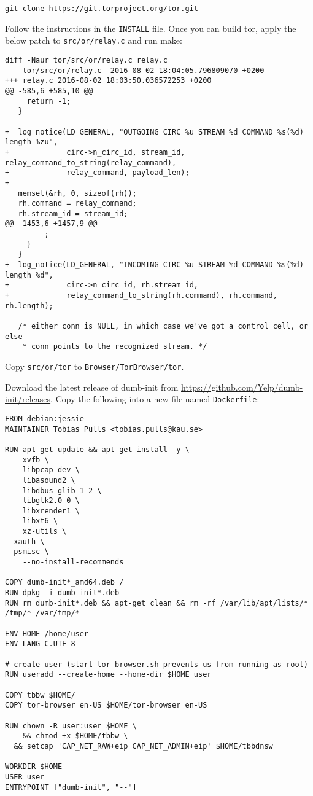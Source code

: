 \documentclass{article}
\begin{document}
\begin{lstlisting}
git clone https://git.torproject.org/tor.git
\end{lstlisting}
Follow the instructions in the {\tt INSTALL} file. Once you can build tor,
apply the below patch to {\tt src/or/relay.c} and run make:
\begin{lstlisting}
diff -Naur tor/src/or/relay.c relay.c
--- tor/src/or/relay.c	2016-08-02 18:04:05.796809070 +0200
+++ relay.c	2016-08-02 18:03:50.036572253 +0200
@@ -585,6 +585,10 @@
     return -1;
   }

+  log_notice(LD_GENERAL, "OUTGOING CIRC %u STREAM %d COMMAND %s(%d) length %zu",
+             circ->n_circ_id, stream_id, relay_command_to_string(relay_command),
+             relay_command, payload_len);
+
   memset(&rh, 0, sizeof(rh));
   rh.command = relay_command;
   rh.stream_id = stream_id;
@@ -1453,6 +1457,9 @@
         ;
     }
   }
+  log_notice(LD_GENERAL, "INCOMING CIRC %u STREAM %d COMMAND %s(%d) length %d",
+             circ->n_circ_id, rh.stream_id,
+             relay_command_to_string(rh.command), rh.command, rh.length);

   /* either conn is NULL, in which case we've got a control cell, or else
    * conn points to the recognized stream. */
\end{lstlisting}
Copy {\tt src/or/tor} to {\tt Browser/TorBrowser/tor}.

Download the latest release of dumb-init from
\url{https://github.com/Yelp/dumb-init/releases}.
Copy the following into a
new file named \texttt{Dockerfile}:

\begin{lstlisting}
FROM debian:jessie
MAINTAINER Tobias Pulls <tobias.pulls@kau.se>

RUN apt-get update && apt-get install -y \
	xvfb \
	libpcap-dev \
	libasound2 \
	libdbus-glib-1-2 \
	libgtk2.0-0 \
	libxrender1 \
	libxt6 \
	xz-utils \
  xauth \
  psmisc \
	--no-install-recommends

COPY dumb-init*_amd64.deb /
RUN dpkg -i dumb-init*.deb
RUN rm dumb-init*.deb && apt-get clean && rm -rf /var/lib/apt/lists/* /tmp/* /var/tmp/*

ENV HOME /home/user
ENV LANG C.UTF-8

# create user (start-tor-browser.sh prevents us from running as root)
RUN useradd --create-home --home-dir $HOME user

COPY tbbw $HOME/
COPY tor-browser_en-US $HOME/tor-browser_en-US

RUN chown -R user:user $HOME \
	&& chmod +x $HOME/tbbw \
  && setcap 'CAP_NET_RAW+eip CAP_NET_ADMIN+eip' $HOME/tbbdnsw

WORKDIR $HOME
USER user
ENTRYPOINT ["dumb-init", "--"]
\end{lstlisting}
\end{document}
